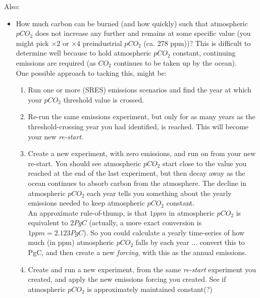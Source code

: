 \newpage

\noindent Also:

\begin{itemize}[noitemsep]

\vspace{1mm}
\item How much carbon can  be burned (and how quickly) such that atmospheric \(pCO_{2}\) does not increase any further and remains at some specific value (you might pick \(\times2\) or \(\times4\) preindustrial \(pCO_{2}\) (ca. 278 ppm))? This is difficult to determine well because to hold atmospheric \(pCO_{2}\)  constant, continuing emissions are required (as \(CO_{2}\) continues to be taken up by the ocean).
\vspace{1mm} 
\\One possible approach to tacking this, might be:
\vspace{1mm} 
\begin{enumerate}[noitemsep]
\item Run one or more (SRES) emissions scenarios and find the year at which your \(pCO_{2}\) threshold value is crossed. 
\item Re-run the same emissions experiment, but only for as many years as the threshold-crossing year you had identified, is reached. This will become your new \textit{re-start}.
\item Create a new experiment, with zero emissions, and run on from your new re-start. You should see atmospheric \(pCO_{2}\) start close to the value you reached at the end of the last experiment, but then decay away as the ocean continues to absorb carbon from the atmosphere. The decline in atmospheric \(pCO_{2}\) each year tells you something about the yearly emissions needed to keep atmospheric \(pCO_{2}\) constant.
\\An approximate rule-of-thump, is that \(1ppm\) in atmospheric \(pCO_{2}\) is equivalent to \(2 PgC\) (actually, a more exact conversion is \(1 ppm = 2.123 PgC\)). So you could calculate a yearly time-series of how much (in ppm) atmospheric \(pCO_{2}\) falls by each year ... convert this to PgC, and then create a new \textit{forcing}, with this as the annual emissions.
\item Create and run a new experiment, from the same \textit{re-start} experiment you created, and apply the new emissions forcing you created. See if atmospheric \(pCO_{2}\) is approximately maintained constant(?)  

\end{enumerate}
\end{itemize}
